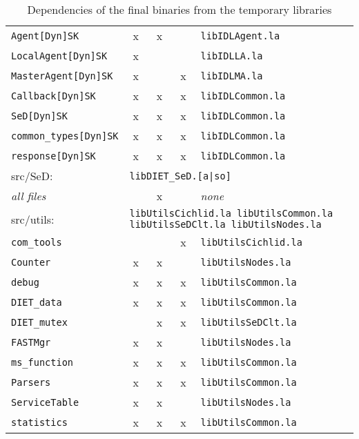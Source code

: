 \begin{table}[h]
\begin{tabular}[c]{|l|c|c|c|l|}
  \texttt{Agent[Dyn]SK}           & x & x &   & \texttt{libIDLAgent.la}\\
  \texttt{LocalAgent[Dyn]SK}      & x &   &   & \texttt{libIDLLA.la}\\
  \texttt{MasterAgent[Dyn]SK}     & x &   & x & \texttt{libIDLMA.la}\\
  \texttt{Callback[Dyn]SK}        & x & x & x & \texttt{libIDLCommon.la}\\
  \texttt{SeD[Dyn]SK}             & x & x & x & \texttt{libIDLCommon.la}\\
  \texttt{common\_types[Dyn]SK}   & x & x & x & \texttt{libIDLCommon.la}\\
  \texttt{response[Dyn]SK}        & x & x & x & \texttt{libIDLCommon.la}\\[5pt]
  \hline


  \multicolumn{1}{|l}{\textsf{src/SeD}:} &
  \multicolumn{4}{l|}{\texttt{libDIET\_SeD.[a|so]}}\\[5pt]

  \textit{all files}              &   & x &   & \emph{none}\\[5pt]
  \hline


  \multicolumn{1}{|l}{\textsf{src/utils}:} &
  \multicolumn{4}{l|}{\texttt{libUtilsCichlid.la libUtilsCommon.la 
                             libUtilsSeDClt.la  libUtilsNodes.la}}\\[5pt]

  \texttt{com\_tools}             &   &   & x & \texttt{libUtilsCichlid.la}\\
  \texttt{Counter}                & x & x &   & \texttt{libUtilsNodes.la}\\
  \texttt{debug}                  & x & x & x & \texttt{libUtilsCommon.la}\\
  \texttt{DIET\_data}             & x & x & x & \texttt{libUtilsCommon.la}\\
  \texttt{DIET\_mutex}            &   & x & x & \texttt{libUtilsSeDClt.la}\\
  \texttt{FASTMgr}                & x & x &   & \texttt{libUtilsNodes.la}\\
  \texttt{ms\_function}           & x & x & x & \texttt{libUtilsCommon.la}\\
  \texttt{Parsers}                & x & x & x & \texttt{libUtilsCommon.la}\\
  \texttt{ServiceTable}           & x & x &   & \texttt{libUtilsNodes.la}\\
  \texttt{statistics}             & x & x & x & \texttt{libUtilsCommon.la}\\[5pt]
  \hline
 

 \end{tabular}
 \caption{Dependencies of the final binaries from the temporary libraries}
 \label{t:dep}
\end{table}


